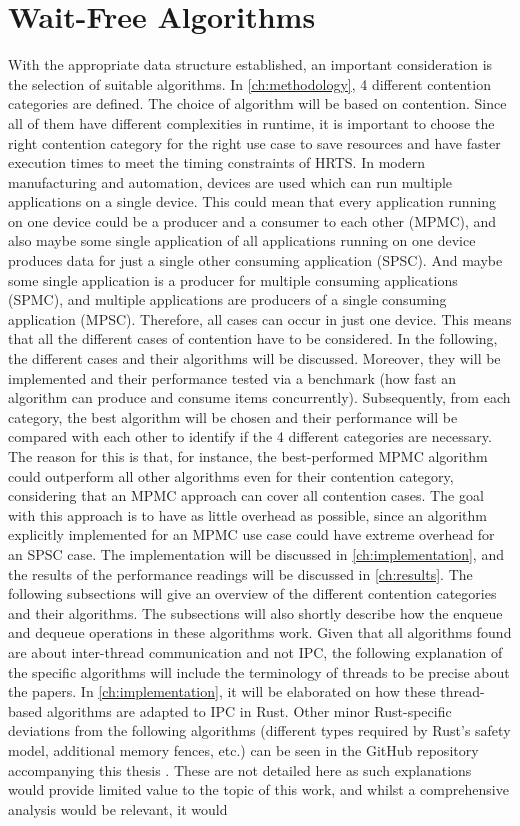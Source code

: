 \section{Wait-Free Algorithms}\label{sec:wait-free-alg}
With the appropriate data structure established, an important consideration is the selection of suitable algorithms. In \cref{ch:methodology}, 4 different contention categories are defined. The choice of algorithm will be based on contention. Since all of them have different complexities in runtime, it is important to choose the right contention category for the right use case to save resources and have faster execution times to meet the timing constraints of \ac{HRTS}. In modern manufacturing and automation, devices are used which can run multiple applications on a single device. This could mean that every application running on one device could be a producer and a consumer to each other (\ac{MPMC}), and also maybe some single application of all applications running on one device produces data for just a single other consuming application (\ac{SPSC}). And maybe some single application is a producer for multiple consuming applications (\ac{SPMC}), and multiple applications are producers of a single consuming application (\ac{MPSC}). Therefore, all cases can occur in just one device. This means that all the different cases of contention have to be considered. In the following, the different cases and their algorithms will be discussed. Moreover, they will be implemented and their performance tested via a benchmark (how fast an algorithm can produce and consume items concurrently). Subsequently, from each category, the best algorithm will be chosen and their performance will be compared with each other to identify if the 4 different categories are necessary. The reason for this is that, for instance, the best-performed \ac{MPMC} algorithm could outperform all other algorithms even for their contention category, considering that an \ac{MPMC} approach can cover all contention cases. The goal with this approach is to have as little overhead as possible, since an algorithm explicitly implemented for an \ac{MPMC} use case could have extreme overhead for an \ac{SPSC} case. The implementation will be discussed in \cref{ch:implementation}, and the results of the performance readings will be discussed in \cref{ch:results}. The following subsections will give an overview of the different contention categories and their algorithms. The subsections will also shortly describe how the enqueue and dequeue operations in these algorithms work. Given that all algorithms found are about inter-thread communication and not \ac{IPC}, the following explanation of the specific algorithms will include the terminology of threads to be precise about the papers. In \cref{ch:implementation}, it will be elaborated on how these thread-based algorithms are adapted to \ac{IPC} in Rust. Other minor Rust-specific deviations from the following algorithms (different types required by Rust's safety model, additional memory fences, etc.) can be seen in the GitHub repository accompanying this thesis \cite{githubMA}. These are not detailed here as such explanations would provide limited value to the topic of this work, and whilst a comprehensive analysis would be relevant, it would 